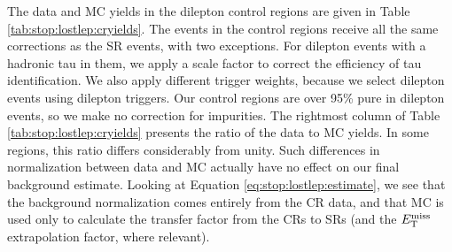 The data and MC yields in the dilepton control regions are given in
Table \ref{tab:stop:lostlep:cryields}. The events in the control
regions receive all the same corrections as the SR
events, with two exceptions. For dilepton events with a hadronic tau
in them, we apply a scale factor to correct the efficiency of tau
identification. We also apply different trigger weights, because we
select dilepton events using dilepton triggers.
Our control regions are over 95\% pure in dilepton events,
so we make no correction for impurities. The rightmost column of Table
\ref{tab:stop:lostlep:cryields} presents the ratio of the data to MC
yields. In some regions, this ratio differs considerably from
unity. Such differences in normalization between data and MC
actually have no effect on our final background estimate. Looking at Equation
\ref{eq:stop:lostlep:estimate}, we see that the background
normalization comes entirely from the CR data, and that MC is used
only to calculate the transfer factor from the CRs to SRs (and the
$E_\text{T}^\text{miss}$ extrapolation factor, where relevant).

